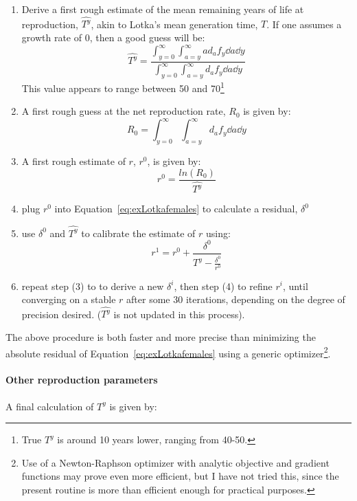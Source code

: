 \begin{enumerate}
  \item Derive a first rough estimate of the mean remaining years of life at
  reproduction, $\widehat{T^y}$, akin to Lotka's mean generation time, $T$. If
  one assumes a growth rate of $0$, then a good guess will be:
\begin{equation}
\widehat{T^y} = \frac{\int _{y=0}^\infty \int _{a=y}^\infty a d_a f_y \dd a
\dd y}{\int _{y=0}^\infty \int _{a=y}^\infty d_a f_y \dd a \dd y}
\end{equation}
 This value appears to range between 50 and 70\footnote{True $T^y$ is around 10
 years lower, ranging from 40-50.}
  \item A first rough guess at the net reproduction rate, $R_0$ is given by:
 \begin{equation}
  R_0 = \int _{y=0}^\infty \int _{a=y}^\infty d_a f_y \dd a
\dd y
\end{equation}
  \item A first rough estimate of $r$, $r^0$, is given by:
   \begin{equation}
   r^0 = \frac{ln(R_0)}{\widehat{T^y}}
   \end{equation}
  \item plug $r^0$ into Equation~\ref{eq:exLotkafemales} to calculate a
  residual, $\delta^0$
  \item use $\delta^0$ and $\widehat{T^y}$ to calibrate the estimate of $r$
  using:
  \begin{equation}
  r^{1} = r^0 + \frac{\delta^0}{\widehat{T^y} - \frac{\delta^0}{r^0}}
  \end{equation}
  \item repeat step (3) to to derive a new $\delta^i$, then step (4) to refine
  $r^i$, until converging on a stable $r$ after some 30 iterations,
  depending on the degree of precision desired. ($\widehat{T^y}$ is not updated
  in this process).
\end{enumerate}

The above procedure is both faster and more precise than minimizing the absolute
residual of Equation~\ref{eq:exLotkafemales} using a generic
optimizer\footnote{Use of a Newton-Raphson optimizer with analytic objective
and gradient functions may prove even more efficient, but I have not tried
this, since the present routine is more than efficient enough for practical
purposes.}. 

\paragraph{Other reproduction parameters}
A final calculation of $T^y$ is given by:

